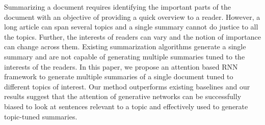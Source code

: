 Summarizing a document requires identifying the important parts of the document with an objective of providing a quick overview to a reader. However, a long article can span several topics and a single summary cannot do justice to all the topics. Further, the interests of readers can vary and the notion of importance can change across them. Existing summarization algorithms generate a single summary and are not capable of generating multiple summaries tuned to the interests of the readers. In this paper, we propose an attention based RNN framework to generate multiple summaries of a single document tuned to different topics of interest. Our method outperforms existing baselines and our results suggest that the attention of generative networks can be successfully biased to look at sentences relevant to a topic and effectively used to generate topic-tuned summaries.
